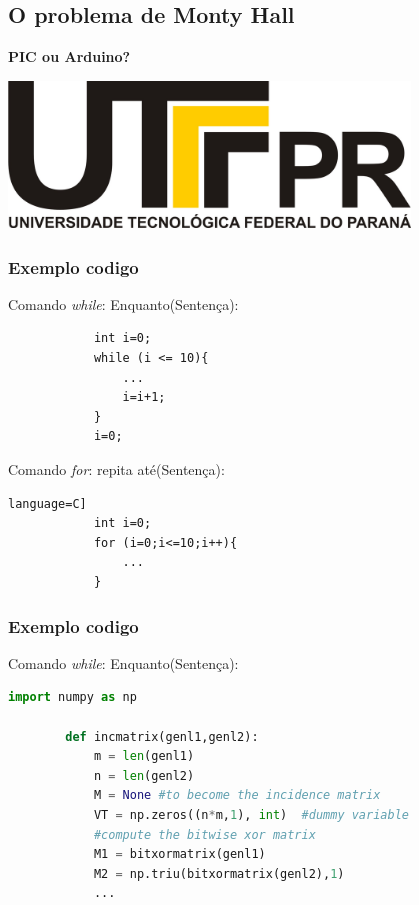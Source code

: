 \documentclass[t]{beamer}
\begin{document}
\subsection{O problema de Monty Hall}
\begin{frame}[c]


\end{frame}
\begin{frame}[c]
	\textbf{PIC ou Arduino?}
	\newline

	\begin{center}
		\includegraphics[width=0.8\textwidth]{images/logo.jpg}
	\end{center}
\end{frame}

\begin{frame}[fragile]
	\frametitle{Exemplo codigo}
		Comando \textit{while}: Enquanto(Sentença):
		\begin{lstlisting}
			int i=0;
			while (i <= 10){
				...
				i=i+1;
			}
			i=0;
		\end{lstlisting}
			Comando \textit{for}: repita até(Sentença):
		\begin{lstlisting}language=C]
			int i=0;
			for (i=0;i<=10;i++){
				...
			}
		\end{lstlisting}
\end{frame}

\begin{frame}[fragile]
	\frametitle{Exemplo codigo}
	Comando \textit{while}: Enquanto(Sentença):

	\begin{lstlisting}[language=Python]
		import numpy as np
		
		def incmatrix(genl1,genl2):
			m = len(genl1)
			n = len(genl2)
			M = None #to become the incidence matrix
			VT = np.zeros((n*m,1), int)  #dummy variable
			#compute the bitwise xor matrix
			M1 = bitxormatrix(genl1)
			M2 = np.triu(bitxormatrix(genl2),1) 
			... 
	\end{lstlisting}
\end{frame}
\end{document}
